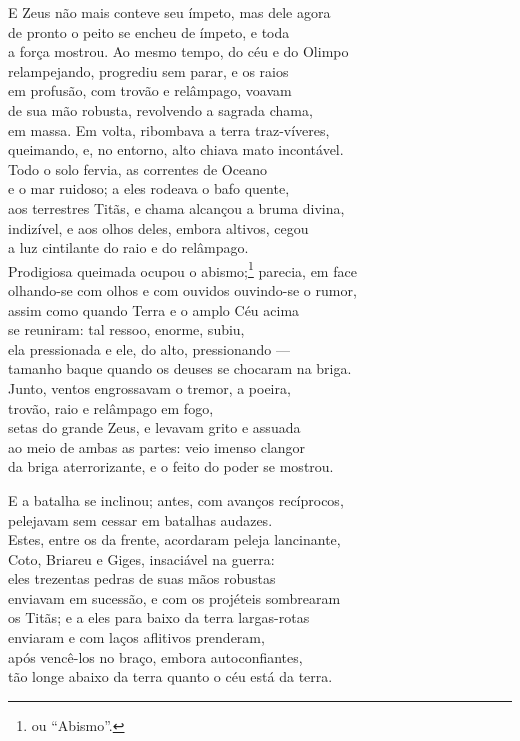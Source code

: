 \quad{}E Zeus não mais conteve seu ímpeto, mas dele agora\\
de pronto o peito se encheu de ímpeto, e toda\\
a força mostrou. Ao mesmo tempo, do céu e do Olimpo\\
relampejando, progrediu sem parar, e os raios \\
em profusão, com trovão e relâmpago, voavam\\
de sua mão robusta, revolvendo a sagrada chama,\\
em massa. Em volta, ribombava a terra traz-víveres,\\
queimando, e, no entorno, alto chiava mato incontável.\\
Todo o solo fervia, as correntes de Oceano \\
e o mar ruidoso; a eles rodeava o bafo quente,\\
aos terrestres Titãs, e chama alcançou a bruma divina,\\
indizível, e aos olhos deles, embora altivos, cegou\\
a luz cintilante do raio e do relâmpago.\\
Prodigiosa queimada ocupou o abismo;\footnote{ou ``Abismo''.} parecia, em face\\
olhando-se com olhos e com ouvidos ouvindo-se o rumor,\\
assim como quando Terra e o amplo Céu acima\\
se reuniram: tal ressoo, enorme, subiu,\\
ela pressionada e ele, do alto, pressionando ---\\
tamanho baque quando os deuses se chocaram na briga. \\
Junto, ventos engrossavam o tremor, a poeira,\\
trovão, raio e relâmpago em fogo,\\
setas do grande Zeus, e levavam grito e assuada\\
ao meio de ambas as partes: veio imenso clangor\\
da briga aterrorizante, e o feito do poder se mostrou. 

\quad{}E a batalha se inclinou; antes, com avanços recíprocos,\\
pelejavam sem cessar em batalhas audazes.\\
Estes, entre os da frente, acordaram peleja lancinante,\\
Coto, Briareu e Giges, insaciável na guerra:\\
eles trezentas pedras de suas mãos robustas \\
enviavam em sucessão, e com os projéteis sombrearam\\
os Titãs; e a eles para baixo da terra largas-rotas\\
enviaram e com laços aflitivos prenderam,\\
após vencê-los no braço, embora autoconfiantes,\\
tão longe abaixo da terra quanto o céu está da terra. 

